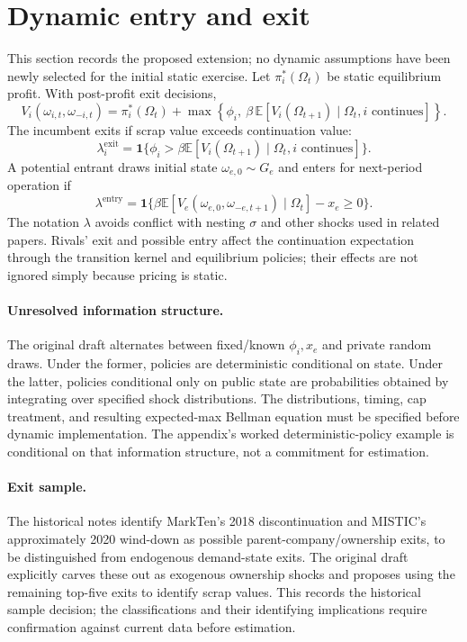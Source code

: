 \documentclass[11pt]{article}
\begin{document}
\section{Dynamic entry and exit}
This section records the proposed extension; no dynamic assumptions have been newly selected for the initial static exercise. Let $\pi_i^*(\Omega_t)$ be static equilibrium profit. With post-profit exit decisions,
\begin{equation}
V_i(\omega_{i,t},\omega_{-i,t})=\pi_i^*(\Omega_t)+
\max\left\{\phi_i,\ \beta\,\mathbb E[V_i(\Omega_{t+1})\mid\Omega_t,i\text{ continues}]\right\}.
\end{equation}
The incumbent exits if scrap value exceeds continuation value:
\[
\lambda_i^{\mathrm{exit}}=\mathbf 1\{\phi_i>\beta\mathbb E[V_i(\Omega_{t+1})\mid\Omega_t,i\text{ continues}]\}.
\]
A potential entrant draws initial state $\omega_{e,0}\sim G_e$ and enters for next-period operation if
\[
\lambda^{\mathrm{entry}}=\mathbf 1\{\beta\mathbb E[V_e(\omega_{e,0},\omega_{-e,t+1})\mid\Omega_t]-x_e\geq0\}.
\]
The notation $\lambda$ avoids conflict with nesting $\sigma$ and other shocks used in related papers. Rivals' exit and possible entry affect the continuation expectation through the transition kernel and equilibrium policies; their effects are not ignored simply because pricing is static.

\paragraph{Unresolved information structure.} The original draft alternates between fixed/known $\phi_i,x_e$ and private random draws. Under the former, policies are deterministic conditional on state. Under the latter, policies conditional only on public state are probabilities obtained by integrating over specified shock distributions. The distributions, timing, cap treatment, and resulting expected-max Bellman equation must be specified before dynamic implementation. The appendix's worked deterministic-policy example is conditional on that information structure, not a commitment for estimation.
\paragraph{Exit sample.} The historical notes identify MarkTen's 2018 discontinuation and MISTIC's approximately 2020 wind-down as possible parent-company/ownership exits, to be distinguished from endogenous demand-state exits. The original draft explicitly carves these out as exogenous ownership shocks and proposes using the remaining top-five exits to identify scrap values. This records the historical sample decision; the classifications and their identifying implications require confirmation against current data before estimation.
\end{document}
